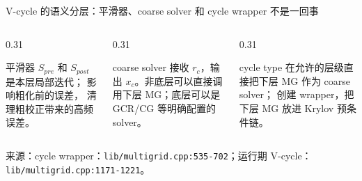 \documentclass[UTF8,aspectratio=169,11pt]{ctexbeamer}
\newcommand{\source}[1]{\vspace{0.05em}\par{\raggedright\scriptsize\color{muted}来源：#1\par}}
\newcommand{\codepath}[1]{\nolinkurl{#1}}
\begin{document}
\begin{frame}[t]{V-cycle 的语义分层：平滑器、coarse solver 和 cycle wrapper 不是一回事}
  \begin{columns}[T,totalwidth=\textwidth]
    \begin{column}{0.31\textwidth}
      \begin{block}{平滑器}
        \(S_{pre}\) 和 \(S_{post}\) 是本层局部迭代；\texttt{} 影响粗化前的误差，\texttt{} 清理粗校正带来的高频误差。
      \end{block}
    \end{column}
    \begin{column}{0.31\textwidth}
      \begin{block}{coarse solver}
        \texttt{} 接收 \(r_c\)，输出 \(x_c\)。非底层可以直接调用下层 MG；底层可以是 GCR/CG 等明确配置的 solver。
      \end{block}
    \end{column}
    \begin{column}{0.31\textwidth}
      \begin{block}{cycle type}
        \texttt{} 在允许的层级直接把下层 MG 作为 coarse solver；\texttt{} 创建 \texttt{} wrapper，把下层 MG 放进 Krylov 预条件链。
      \end{block}
    \end{column}
  \end{columns}
  \vspace{0.16cm}
  \begin{center}
  \end{center}
  \source{cycle wrapper：\codepath{lib/multigrid.cpp:535-702}；运行期 V-cycle：\codepath{lib/multigrid.cpp:1171-1221}。}
\end{frame}
\end{document}
